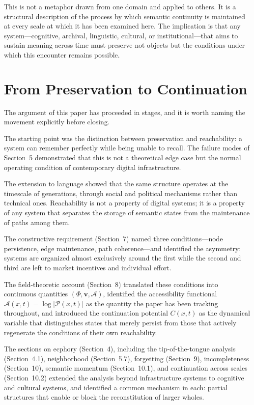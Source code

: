 \documentclass[12pt]{article}
\begin{document}
This is not a metaphor drawn from one domain and applied to others.
It is a structural description of the process by which semantic continuity
is maintained at every scale at which it has been examined here.
The implication is that any system---cognitive, archival, linguistic,
cultural, or institutional---that aims to sustain meaning across time
must preserve not objects but the conditions under which this encounter
remains possible.

\section{From Preservation to Continuation}

The argument of this paper has proceeded in stages, and it is worth naming
the movement explicitly before closing.

The starting point was the distinction between preservation and reachability:
a system can remember perfectly while being unable to recall.
The failure modes of Section~5 demonstrated that this is not a theoretical
edge case but the normal operating condition of contemporary digital
infrastructure.

The extension to language showed that the same structure operates at the
timescale of generations, through social and political mechanisms rather
than technical ones.
Reachability is not a property of digital systems; it is a property of
any system that separates the storage of semantic states from the
maintenance of paths among them.

The constructive requirement (Section~7) named three conditions---node
persistence, edge maintenance, path coherence---and identified the
asymmetry: systems are organized almost exclusively around the first while
the second and third are left to market incentives and individual effort.

The field-theoretic account (Section~8) translated these conditions into
continuous quantities $(\Phi, \mathbf{v}, \mathcal{A})$, identified the
accessibility functional $\mathcal{A}(x,t) = \log|\mathcal{P}(x,t)|$ as
the quantity the paper has been tracking throughout, and introduced the
continuation potential $C(x,t)$ as the dynamical variable that
distinguishes states that merely persist from those that actively
regenerate the conditions of their own reachability.

The sections on ecphory (Section~4), including the tip-of-the-tongue
analysis (Section~4.1), neighborhood (Section~5.7), forgetting (Section~9),
incompleteness (Section~10), semantic momentum (Section~10.1), and
continuation across scales (Section~10.2)
extended the analysis beyond infrastructure systems to cognitive and cultural
systems, and identified a common mechanism in each: partial structures that
enable or block the reconstitution of larger wholes.
\end{document}
